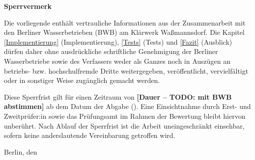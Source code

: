 
\thispagestyle{empty}


\begin{center}
  \textbf{\Large Sperrvermerk}
\end{center}


Die vorliegende \thethesistyp{} enthält vertrauliche Informationen aus der Zusammenarbeit mit den Berliner Wasserbetrieben (BWB) am Klärwerk Waßmannsdorf. Die Kapitel \ref{Implementierung} (Implementierung), \ref{Tests} (Tests) und \ref{Fazit} (Ausblick) dürfen daher ohne ausdrückliche schriftliche Genehmigung der Berliner Wasserbetriebe sowie des Verfassers weder als Ganzes noch in Auszügen an betriebs- bzw. hochschulfremde Dritte weitergegeben, veröffentlicht, vervielfältigt oder in sonstiger Weise zugänglich gemacht werden.

Diese Sperrfrist gilt für einen Zeitraum von \textbf{[Dauer -- TODO: mit BWB abstimmen]} ab dem Datum der Abgabe (\thedatum). Eine Einsichtnahme durch Erst- und Zweitprüfer:in sowie das Prüfungsamt im Rahmen der Bewertung bleibt hiervon unberührt. Nach Ablauf der Sperrfrist ist die Arbeit uneingeschränkt einsehbar, sofern keine anderslautende Vereinbarung getroffen wird.


Berlin, den \thedatum

\vspace*{1.5cm}

\theautor


\clearpage

